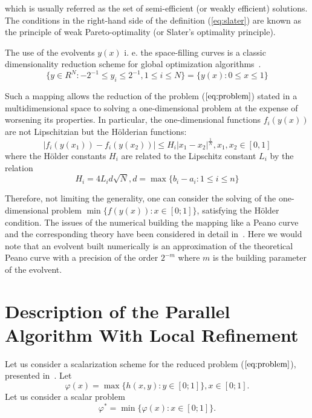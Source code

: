 \documentclass{llncs}
\begin{document}
which is usually referred as the set of semi-efficient (or weakly efficient) solutions. The
conditions in the right-hand side of the definition (\ref{eq:slater}) are known as the principle of
weak Pareto-optimality (or Slater's optimality principle).

The use of the evolvents \(y(x)\) i. e. the space-filling curves is a classic dimensionality
reduction scheme for global optimization algorithms~\cite{evolvents2013}.
\begin{displaymath}
\label{cube}
\lbrace y\in R^N:-2^{-1}\leqslant y_i\leqslant 2^{-1},1\leqslant i\leqslant
N\rbrace=\{y(x):0\leqslant x\leqslant 1\}
\end{displaymath}
\par
Such a mapping allows the reduction of the problem (\(\ref{eq:problem}\)) stated in a
multidimensional space to solving a one-dimensional problem at the expense of worsening its
properties.
In particular, the one-dimensional functions \(f_i(y(x))\) are not Lipschitzian but the
H\"olderian functions:
\begin{equation}
\label{eq:holder}
|f_i(y(x_1))-f_i(y(x_2))|\leqslant H_i{|x_1-x_2|}^{\frac{1}{N}},x_1,x_2\in[0,1]
\end{equation}
where the H\"older constants \(H_i\) are related to the Lipschitz constant \(L_i\) by the relation
\begin{displaymath}
H_i=4L_id\sqrt{N},d=\max\{b_i-a_i:1\leqslant i\leqslant n\}
\end{displaymath}
\par
Therefore, not limiting the generality, one can consider the solving of the
one-dimensional problem \(\min\{f(y(x)): x\in [0;1]\}\), satisfying the H\"older condition. The
issues of the numerical building the mapping like a Peano curve and the corresponding theory
have been considered in detail in~\cite{evolvents2013}. Here we would note that an evolvent
built numerically is an approximation of the theoretical Peano curve with a precision of the
order \(2^{-m}\) where \(m\) is the building parameter of the evolvent.

\section{Description of the Parallel Algorithm With Local Refinement}
\label{sec:algorithm}
Let us consider a scalarization scheme for the reduced problem (\(\ref{eq:problem}\)),
presented in~\cite{markinStrongin1993}. Let
\begin{equation}
  \varphi(x)=\max\{h(x,y):y\in [0;1]\},x\in [0;1].
\end{equation}
Let us consider a scalar problem
\begin{equation}
  \label{eq:aux_problem}
  \varphi^*=\min\{\varphi(x):x\in [0;1]\}.
\end{equation}
\end{document}
